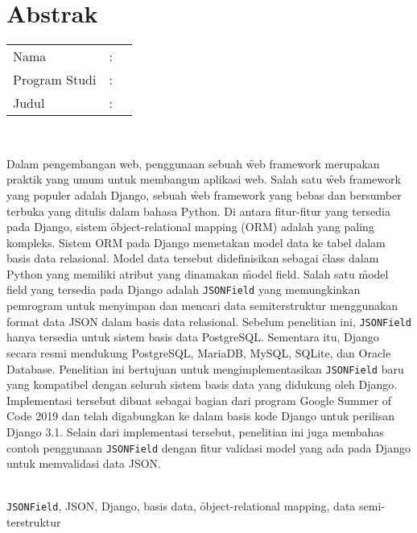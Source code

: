 %
%
%

\chapter*{Abstrak}
\singlespacing

\vspace*{0.2cm}

\noindent \begin{tabular}{l l p{10cm}}
	Nama&: & \penulis \\
	Program Studi&: & \programIndonesia \\
	Judul&: & \judulIndonesia \\
\end{tabular} \\

\vspace*{0.5cm}

\noindent
Dalam pengembangan web, penggunaan sebuah \f{web framework} merupakan praktik
yang umum untuk membangun aplikasi web. Salah satu \f{web framework} yang
populer adalah Django, sebuah \f{web framework} yang bebas dan bersumber
terbuka yang ditulis dalam bahasa Python. Di antara fitur-fitur yang tersedia
pada Django, sistem \f{object-relational mapping} (ORM) adalah yang paling
kompleks. Sistem ORM pada Django memetakan model data ke tabel dalam basis data
relasional. Model data tersebut didefinisikan sebagai \f{class} dalam Python
yang memiliki atribut yang dinamakan \f{model field}. Salah satu \f{model
field} yang tersedia pada Django adalah \verb|JSONField| yang memungkinkan
pemrogram untuk menyimpan dan mencari data semiterstruktur menggunakan format
data JSON dalam basis data relasional. Sebelum penelitian ini, \verb|JSONField|
hanya tersedia untuk sistem basis data PostgreSQL. Sementara itu, Django secara
resmi mendukung PostgreSQL, MariaDB, MySQL, SQLite, dan Oracle Database.
Penelitian ini bertujuan untuk mengimplementasikan \verb|JSONField| baru yang
kompatibel dengan seluruh sistem basis data yang didukung oleh Django.
Implementasi tersebut dibuat sebagai bagian dari program Google Summer of Code
2019 dan telah digabungkan ke dalam basis kode Django untuk perilisan Django
3.1. Selain dari implementasi tersebut, penelitian ini juga membahas contoh
penggunaan \verb|JSONField| dengan fitur validasi model yang ada pada Django
untuk memvalidasi data JSON. \\

\vspace*{0.2cm}

\noindent {} \\
\verb|JSONField|, JSON, Django, basis data, \f{object-relational mapping}, data
semi-terstruktur \\

\onehalfspacing
\newpage
